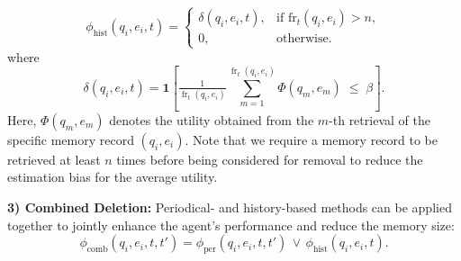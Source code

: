 \documentclass[11pt]{article}
\theoremstyle{plain}
\theoremstyle{definition}
\begin{document}
\[
\phi_{\text{hist}}(q_i, e_i, t) =
\begin{cases}
\delta(q_i, e_i, t), & \text{if } \text{fr}_t(q_i, e_i) > n, \\
0, & \text{otherwise}.
\end{cases}
\]
where
\[
\delta(q_i, e_i, t) 
= \mathbf{1}\!\left[
  \tfrac{1}{\operatorname{fr}_{t}(q_i, e_i)}
  \sum_{m=1}^{\operatorname{fr}_{t}(q_i, e_i)} 
  \Phi(q_m, e_m)
  \;\le\; \beta
\right].
\]
Here, $\Phi(q_m, e_m)$ denotes the utility obtained from the $m$-th retrieval of the specific memory record $(q_i, e_i)$.
Note that we require a memory record to be retrieved at least $n$ times before being considered for removal to reduce the estimation bias for the average utility.


\textbf{3) Combined Deletion:}
Periodical- and history-based methods can be applied together to jointly enhance the agent's performance and reduce the memory size:
\[
\phi_{\text{comb}}(q_i,e_i,t,t') = 
\phi_{\text{per}}(q_i,e_i,t,t') \,\lor\, \phi_{\text{hist}}(q_i,e_i,t).
\]
\end{document}
